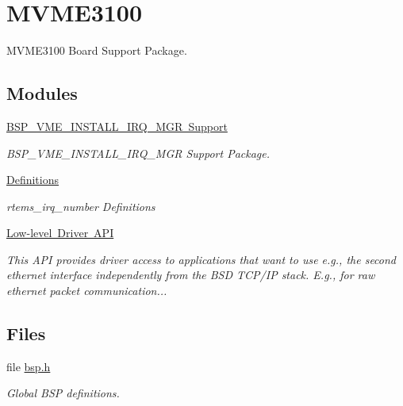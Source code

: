 \hypertarget{group__RTEMSBSPsPowerPCMVME3100}{}\section{M\+V\+M\+E3100}
\label{group__RTEMSBSPsPowerPCMVME3100}


M\+V\+M\+E3100 Board Support Package.  


\subsection*{Modules}
\begin{DoxyCompactItemize}
\item 
\mbox{\hyperlink{group__powerpc__vme}{B\+S\+P\+\_\+\+V\+M\+E\+\_\+\+I\+N\+S\+T\+A\+L\+L\+\_\+\+I\+R\+Q\+\_\+\+M\+G\+R Support}}
\begin{DoxyCompactList}\small\item\em B\+S\+P\+\_\+\+V\+M\+E\+\_\+\+I\+N\+S\+T\+A\+L\+L\+\_\+\+I\+R\+Q\+\_\+\+M\+GR Support Package. \end{DoxyCompactList}\item 
\mbox{\hyperlink{group__powerpc__irq}{Definitions}}
\begin{DoxyCompactList}\small\item\em rtems\+\_\+irq\+\_\+number Definitions \end{DoxyCompactList}\item 
\mbox{\hyperlink{group__powerpc__iftsecpub}{Low-\/level Driver A\+PI}}
\begin{DoxyCompactList}\small\item\em This A\+PI provides driver access to applications that want to use e.\+g., the second ethernet interface independently from the B\+SD T\+C\+P/\+IP stack. E.\+g., for raw ethernet packet communication... \end{DoxyCompactList}\end{DoxyCompactItemize}
\subsection*{Files}
\begin{DoxyCompactItemize}
\item 
file \mbox{\hyperlink{bsps_2powerpc_2mvme3100_2include_2bsp_8h}{bsp.\+h}}
\begin{DoxyCompactList}\small\item\em Global B\+SP definitions. \end{DoxyCompactList}\end{DoxyCompactItemize}
